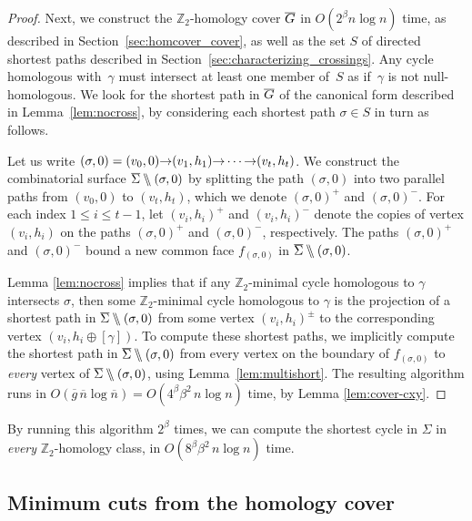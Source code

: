 \documentclass[11pt,twoside]{article}
\def\arcto{\mathord\shortrightarrow}
\def\Z{\mathbb{Z}}
\def\snip{\mathbin{\raisebox{0.15ex}{\rotatebox[origin=c]{60}{\Rightscissors}\!}}}
\def\snip{\mathbin{\backslash\!\!\backslash}}
\def\cycle{\gamma}
\def\Sigmabar{\overline{\smash{\Sigma}\vphantom{t}}}
\def\Gbar{\overline{\smash{G}\vphantom{t}}}
\def\nbar{\overline{n}}
\def\gbar{\overline{g}}
\begin{document}
{\begin{proof}
Next, we construct the $\Z_2$-homology cover $\Gbar$ in $O(2^\beta n\log n)$ time, as described in Section~\ref{sec:homcover_cover}, as well as the set $S$ of directed shortest paths described in Section~\ref{sec:characterizing_crossings}.
Any cycle homologous with~$\cycle$ must intersect at least one member of~$S$ as if~$\cycle$ is not null-homologous.
We look for the shortest path in $\Gbar$ of the canonical form described in Lemma~\ref{lem:nocross}, by considering each shortest path $\sigma\in S$ in turn as follows.

Let us write $(\sigma,0) = (v_0,0) \arcto (v_1,h_1) \arcto\allowbreak \cdots\arcto (v_t, h_t)$.  We construct the combinatorial surface $\Sigmabar\snip(\sigma,0)$ by splitting the path $(\sigma,0)$ into two parallel paths from $(v_0,0)$ to $(v_t,h_t)$, which we denote  $(\sigma,0)^+$ and $(\sigma,0)^-$.  For each index $1\le i\le t-1$, let $(v_i,h_i)^+$ and $(v_i,h_i)^-$ denote the copies of vertex $(v_i,h_i)$  on the paths $(\sigma,0)^+$ and $(\sigma,0)^-$, respectively.  The paths $(\sigma,0)^+$ and $(\sigma,0)^-$ bound a new common face $f_{(\sigma,0)}$ in $\Sigmabar\snip(\sigma,0)$.

Lemma \ref{lem:nocross} implies that if any $\Z_2$-minimal cycle homologous to $\cycle$ intersects $\sigma$, then some $\Z_2$-minimal cycle homologous to $\cycle$ is the projection of a shortest path in $\Sigmabar\snip(\sigma,0)$ from some vertex $(v_i,h_i)^\pm$ to the corresponding vertex $(v_i, h_i\oplus[\cycle])$.  To compute these shortest paths, we implicitly compute the shortest path in $\Sigmabar\snip(\sigma,0)$ from every vertex on the boundary of $f_{(\sigma,0)}$ to \emph{every} vertex of $\Sigmabar\snip(\sigma,0)$, using Lemma~\ref{lem:multishort}.  The resulting algorithm runs in $O(\gbar\,\nbar \log \nbar) = O(4^\beta \beta^2\, n\log n)$ time, by Lemma \ref{lem:cover-cxy}.
\end{proof}

By running this algorithm $2^\beta$ times, we can compute the shortest cycle in $\Sigma$ in \emph{every} $\Z_2$-homology class, in $O(8^\beta \beta^2\, n\log n)$ time.


\subsection{Minimum cuts from the homology cover}
\label{sec:homcover_mincut}

}
\end{document}
